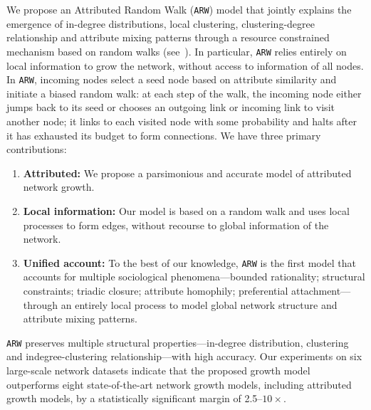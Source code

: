 We propose an Attributed Random Walk (\texttt{ARW}) model that jointly explains
the emergence of in-degree distributions, local clustering, clustering-degree
relationship and attribute mixing patterns through a resource constrained mechanism based on random walks (see~). In particular, \texttt{ARW} relies entirely on local information to grow the network, without access to information of all nodes. In \texttt{ARW}, incoming nodes select a seed node based on attribute similarity and initiate a biased random walk: at each step of the walk, the incoming node either jumps back to its seed or chooses an outgoing link or incoming link to visit another node; it links to each visited node with some probability and halts after it has exhausted its budget to form connections. We have three primary contributions:
\begin{enumerate}
\item \textbf{Attributed:} We propose a parsimonious and accurate model of attributed network growth.
\item \textbf{Local information:} Our model is based on a random walk and uses local processes to form edges, without recourse to global information of the network.
\item \textbf{Unified account:} To the best of our knowledge, \texttt{ARW} is the first model that accounts for multiple sociological phenomena---bounded rationality; structural constraints; triadic closure; attribute homophily; preferential attachment---through an entirely local process to model global network structure and attribute mixing patterns.
\end{enumerate}



\texttt{ARW} preserves multiple structural properties---in-degree distribution, clustering and
indegree-clustering relationship---with high accuracy.
Our experiments on six large-scale network datasets indicate that the proposed growth model outperforms
eight state-of-the-art network growth models, including attributed growth models, by a
statistically significant margin of 2.5--$10\times$.

